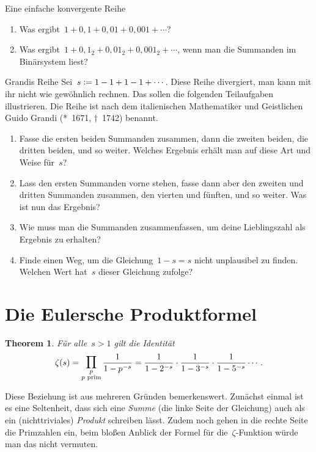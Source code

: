 \documentclass[twoside]{../zirkelblatt1415}
\theoremstyle{definition}
\theoremstyle{plain}
\newtheorem{thm}[defn]{Theorem}
\theoremstyle{remark}
\newcommand{\defeq}{\vcentcolon=}
\newcommand{\prim}[1]{\text{\textnormal{$#1$ prim}}}
\newcommand{\bigprod}{\mathop{\mathlarger{\mathlarger{\prod}}}}
\begin{document}
\begin{aufgabe}{Eine einfache konvergente Reihe}\label{aufg:konvergente-reihen}
\begin{enumerate}
\item Was ergibt~$1 + 0{,}1 + 0{,}01 + 0{,}001 + \cdots$?
\item Was ergibt~$1 + 0{,}1_2 + 0{,}01_2 + 0{,}001_2 + \cdots$, wenn man die
Summanden im Binärsystem liest?
\end{enumerate}\fixlistspacing
\end{aufgabe}

\begin{aufgabe}{Grandis Reihe}\label{aufg:grandi}
Sei~$s \defeq 1 - 1 + 1 - 1 + \cdots$. Diese Reihe divergiert, man kann mit ihr
nicht wie gewöhnlich rechnen. Das sollen die folgenden Teilaufgaben
illustrieren. Die Reihe ist nach dem italienischen Mathematiker und
Geistlichen Guido Grandi (*~1671, †~1742) benannt.
\begin{enumerate}
\item Fasse die ersten beiden Summanden zusammen, dann die zweiten beiden, die
dritten beiden, und so weiter. Welches Ergebnis erhält man auf diese Art und
Weise für~$s$?
\item Lass den ersten Summanden vorne stehen, fasse dann aber den zweiten und
dritten Summanden zusammen, den vierten und fünften, und so weiter. Was
ist nun das Ergebnis?
\item Wie muss man die Summanden zusammenfassen, um deine Lieblingszahl als
Ergebnis zu erhalten?
\item Finde einen Weg, um die Gleichung~$1 - s = s$ nicht unplausibel zu
finden. Welchen Wert hat~$s$ dieser Gleichung zufolge?
\end{enumerate}\fixlistspacing
\end{aufgabe}


\section{Die Eulersche Produktformel}\label{sect:euler-produkt}

\begin{thm}Für alle~$s > 1$ gilt die Identität
\[ \zeta(s) = \bigprod_{\substack{p\\\prim{p}}} \frac{1}{1 - p^{-s}} =
  \frac{1}{1 - 2^{-s}} \cdot \frac{1}{1 - 3^{-s}} \cdot \frac{1}{1 - 5^{-s}} \cdots. \]
\end{thm}
Diese Beziehung ist aus mehreren Gründen bemerkenswert. Zunächst einmal ist es
eine Seltenheit, dass sich eine \emph{Summe} (die linke Seite der Gleichung)
auch als ein (nichttriviales) \emph{Produkt} schreiben lässt. Zudem noch gehen
in die rechte Seite die Primzahlen ein, beim bloßen Anblick der Formel für
die~$\zeta$-Funktion würde man das nicht vermuten.
\end{document}
